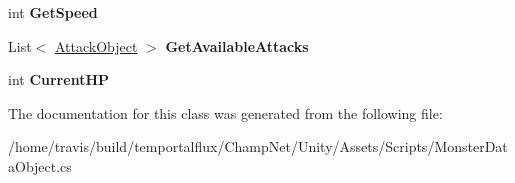 \begin{DoxyCompactItemize}
\item 
\hypertarget{class_monster_data_object_a0d7639dc92ae01942b1b996565eff2ae}{int {\bfseries Get\-Speed}}\label{class_monster_data_object_a0d7639dc92ae01942b1b996565eff2ae}

\item 
\hypertarget{class_monster_data_object_aced78f5f04d3dbb79a0f8291fbe118bd}{List$<$ \hyperlink{class_attack_object}{Attack\-Object} $>$ {\bfseries Get\-Available\-Attacks}}\label{class_monster_data_object_aced78f5f04d3dbb79a0f8291fbe118bd}

\item 
\hypertarget{class_monster_data_object_a3fb8d9a68f08c27657016a72c94faad2}{int {\bfseries Current\-H\-P}}\label{class_monster_data_object_a3fb8d9a68f08c27657016a72c94faad2}

\end{DoxyCompactItemize}


The documentation for this class was generated from the following file\-:\begin{DoxyCompactItemize}
\item 
/home/travis/build/temportalflux/\-Champ\-Net/\-Unity/\-Assets/\-Scripts/Monster\-Data\-Object.\-cs\end{DoxyCompactItemize}
